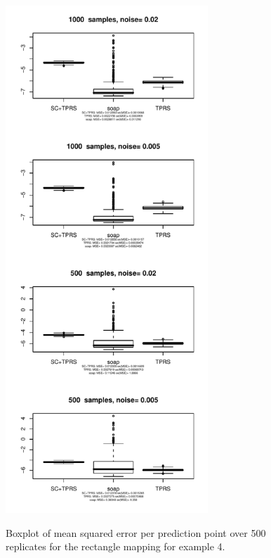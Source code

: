 \documentclass[a4paper,10pt]{amsart}
\begin{document}
\begin{figure}[p]
\centering
\includegraphics[width=3in]{figs-otherdomains/wigglytop2-bbox-boxplots.pdf} \\
\caption{Boxplot of mean squared error per prediction point over 500 replicates for the rectangle mapping for example 4.}
\label{wigglytop2-bbox-boxplots}
\end{figure}
\end{document}
